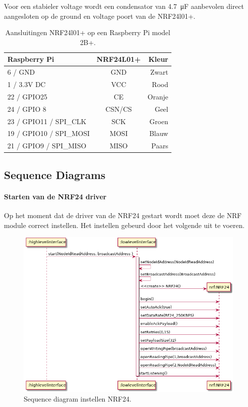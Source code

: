 \documentclass[a4paper, 11pt, oneside]{report}
\begin{document}
Voor een stabieler voltage wordt een condensator van \SI{4.7}{\micro\farad} aanbevolen direct aangesloten op de ground en voltage poort van de NRF24l01+.

\begin{table}[H]
	\centering
		\begin{tabular}{|l|c|r|}
			\hline
			\rowcolor[HTML]{C0C0C0} 
			Raspberry Pi & NRF24L01+ & Kleur \\ \hline
			6 / GND & GND & Zwart \\ \hline
			1 / 3.3V DC & VCC & Rood \\ \hline
			22 / GPIO25 & CE & Oranje \\ \hline
			24 / GPIO 8 & CSN/CS & Geel \\ \hline
			23 / GPIO11 / SPI\_CLK & SCK & Groen \\ \hline
			19 / GPIO10 / SPI\_MOSI & MOSI & Blauw \\ \hline
			21 / GPIO9 / SPI\_MISO & MISO & Paars \\ \hline
		\end{tabular}%
	\caption{Aansluitingen NRF24l01+ op een Raspberry Pi model 2B+.}
	\label{tab:raspberry-nrf-aanslutingen}
\end{table}

\subsection{Sequence Diagrams}
\label{DetailedDesign:NRF24:sequence}

\paragraph{Starten van de NRF24 driver}
\label{DetailedDesign:NRF24:sequence:SetupNRF24}

Op het moment dat de driver van de NRF24 gestart wordt moet deze de NRF module correct instellen.
Het instellen gebeurd door het volgende uit te voeren.
\begin{figure}[H]
	\begin{center}\includegraphics[width=.9\linewidth]{UML/out/NRF24/sequence/SetupNRF24/SetupNRF24.png}\end{center}
	\caption{Sequence diagram instellen NRF24.}
	\label{fig:NRF24:sequence:SetupNRF24}
\end{figure}
\end{document}
